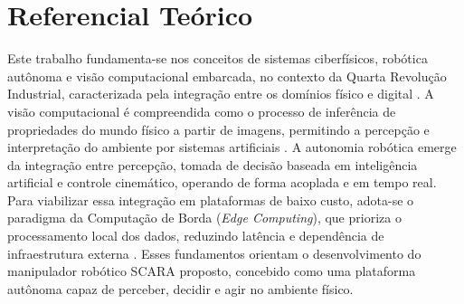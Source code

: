 \chapter*{Referencial Teórico}

Este trabalho fundamenta-se nos conceitos de sistemas ciberfísicos, robótica autônoma e visão computacional embarcada, no contexto da Quarta Revolução Industrial, caracterizada pela integração entre os domínios físico e digital . A visão computacional é compreendida como o processo de inferência de propriedades do mundo físico a partir de imagens, permitindo a percepção e interpretação do ambiente por sistemas artificiais . A autonomia robótica emerge da integração entre percepção, tomada de decisão baseada em inteligência artificial e controle cinemático, operando de forma acoplada e em tempo real. Para viabilizar essa integração em plataformas de baixo custo, adota-se o paradigma da Computação de Borda (\textit{Edge Computing}), que prioriza o processamento local dos dados, reduzindo latência e dependência de infraestrutura externa . Esses fundamentos orientam o desenvolvimento do manipulador robótico SCARA proposto, concebido como uma plataforma autônoma capaz de perceber, decidir e agir no ambiente físico.